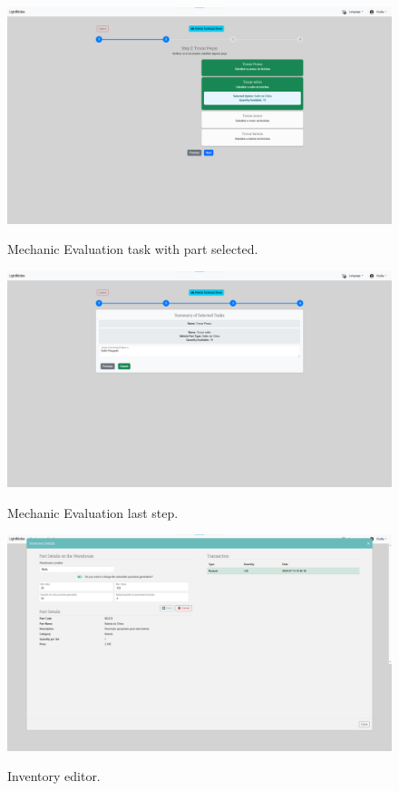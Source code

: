 \begin{figure}[htbp]
  \caption{Mechanic Evaluation task with part selected.}
  \centering
  \includegraphics[width=\textwidth]{figs/Implementation/mechanic/TaskSelected}
  \label{fig:TaskSelected}
\end{figure}



\begin{figure}[htbp]
  \caption{Mechanic Evaluation last step.}
  \centering
  \includegraphics[width=\textwidth]{figs/Implementation/mechanic/EvaluationLastStep}
  \label{fig:EvaluationLastStep}
\end{figure}




\begin{figure}[htbp]
  \caption{Inventory editor.}
  \centering
  \includegraphics[width=\textwidth]{figs/Implementation/warehouse/inventoryEdit}
  \label{fig:inventoryEdit}
\end{figure}




